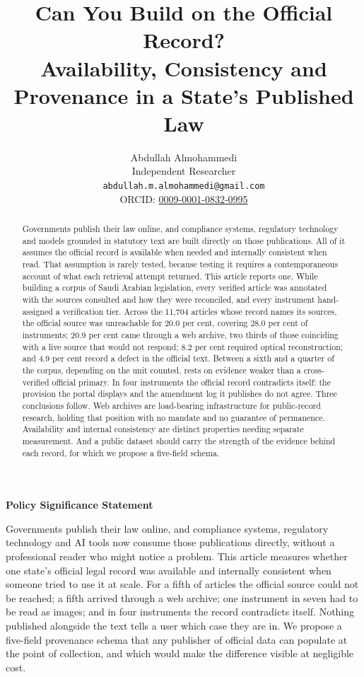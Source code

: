 \documentclass[11pt]{article}
\title{Can You Build on the Official Record?\\
Availability, Consistency and Provenance in a State's Published Law}
\author{}
\date{}
\author{Abdullah Almohammedi \\
    Independent Researcher \\
    \texttt{abdullah.m.almohammedi@gmail.com} \\
    ORCID: \href{https://orcid.org/0009-0001-0832-0995}{0009-0001-0832-0995}}
\date{}
\begin{document}
\maketitle

\begin{abstract}
\noindent
Governments publish their law online, and compliance systems, regulatory
technology and models grounded in statutory text are built directly on those
publications. All of it assumes the official record is available when needed
and internally consistent when read. That assumption is rarely tested, because
testing it requires a contemporaneous account of what each retrieval attempt
returned. This article reports one. While building a corpus of Saudi Arabian
legislation, every verified article was annotated with the sources consulted
and how they were reconciled, and every instrument hand-assigned a
verification tier. Across the 11,704 articles whose record names its sources,
the official source was unreachable for 20.0 per cent, covering 28.0 per cent
of instruments; 20.9 per cent came through a web archive, two thirds of those
coinciding with a live source that would not respond; 8.2 per cent required
optical reconstruction; and 4.9 per cent record a defect in the official text.
Between a sixth and a quarter of the corpus, depending on the unit counted,
rests on evidence weaker than a cross-verified official primary. In four
instruments the official record contradicts itself: the provision the portal
displays and the amendment log it publishes do not agree. Three conclusions
follow. Web archives are load-bearing infrastructure for public-record
research, holding that position with no mandate and no guarantee of
permanence. Availability and internal consistency are distinct properties
needing separate measurement. And a public dataset should carry the strength
of the evidence behind each record, for which we propose a five-field schema.
\end{abstract}

\vspace{1em}
\noindent\textbf{Policy Significance Statement}

\noindent
Governments publish their law online, and compliance systems, regulatory
technology and AI tools now consume those publications directly, without a
professional reader who might notice a problem. This article measures whether
one state's official legal record was available and internally consistent when
someone tried to use it at scale. For a fifth of articles the official source
could not be reached; a fifth arrived through a web archive; one instrument in
seven had to be read as images; and in four instruments the record contradicts
itself. Nothing published alongside the text tells a user which case they are
in. We propose a five-field provenance schema that any publisher of official
data can populate at the point of collection, and which would make the
difference visible at negligible cost.
\end{document}
